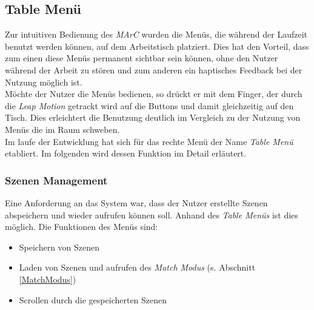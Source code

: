 
\subsection{Table Menü}\label{sec:TableMenü}

Zur intuitiven Bedienung des \textit{MArC} wurden die Menüs, die während der Laufzeit benutzt werden können, auf dem Arbeitstisch platziert. Dies hat den Vorteil, dass zum einen diese Menüs permanent sichtbar sein können, ohne den Nutzer während der Arbeit zu stören und zum anderen ein haptisches Feedback bei der Nutzung möglich ist.\\
Möchte der Nutzer die Menüs bedienen, so drückt er mit dem Finger, der durch die \textit{Leap Motion} getrackt wird auf die Buttons und damit gleichzeitig auf den Tisch. Dies erleichtert die Benutzung deutlich im Vergleich zu der Nutzung von Menüs die im Raum schweben.\\
Im laufe der Entwicklung hat sich für das rechte Menü der Name \textit{Table Menü} etabliert. Im folgenden wird dessen Funktion im Detail erläutert.

\subsubsection{Szenen Management}
Eine Anforderung an das System war, dass der Nutzer erstellte Szenen abspeichern und wieder aufrufen können soll. Anhand des \textit{Table Menüs} ist dies möglich. Die Funktionen des Menüs sind:
\begin{itemize}
	\item Speichern von Szenen
	\item Laden von Szenen und aufrufen des \textit{Match Modus} (s. Abschnitt \ref{MatchModus})
	\item Scrollen durch die gespeicherten Szenen

\end{itemize}



